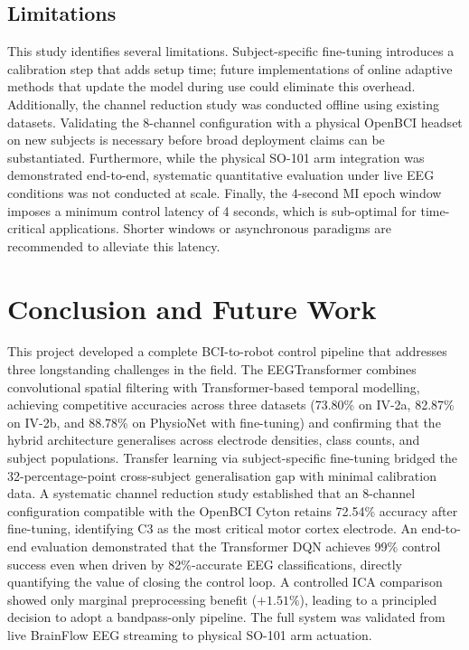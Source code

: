 \documentclass[12pt, a4paper]{article}
\begin{document}
\subsection{Limitations}

This study identifies several limitations. Subject-specific fine-tuning introduces a calibration step that adds setup time; future implementations of online adaptive methods that update the model during use could eliminate this overhead. Additionally, the channel reduction study was conducted offline using existing datasets. Validating the 8-channel configuration with a physical OpenBCI headset on new subjects is necessary before broad deployment claims can be substantiated. Furthermore, while the physical SO-101 arm integration was demonstrated end-to-end, systematic quantitative evaluation under live EEG conditions was not conducted at scale. Finally, the 4-second MI epoch window imposes a minimum control latency of 4 seconds, which is sub-optimal for time-critical applications. Shorter windows or asynchronous paradigms are recommended to alleviate this latency.

\section{Conclusion and Future Work}

This project developed a complete BCI-to-robot control pipeline that addresses three longstanding challenges in the field. The EEGTransformer combines convolutional spatial filtering with Transformer-based temporal modelling, achieving competitive accuracies across three datasets (73.80\% on IV-2a, 82.87\% on IV-2b, and 88.78\% on PhysioNet with fine-tuning) and confirming that the hybrid architecture generalises across electrode densities, class counts, and subject populations. Transfer learning via subject-specific fine-tuning bridged the 32-percentage-point cross-subject generalisation gap with minimal calibration data. A systematic channel reduction study established that an 8-channel configuration compatible with the OpenBCI Cyton retains 72.54\% accuracy after fine-tuning, identifying C3 as the most critical motor cortex electrode. An end-to-end evaluation demonstrated that the Transformer DQN achieves 99\% control success even when driven by 82\%-accurate EEG classifications, directly quantifying the value of closing the control loop. A controlled ICA comparison showed only marginal preprocessing benefit ($+1.51\%$), leading to a principled decision to adopt a bandpass-only pipeline. The full system was validated from live BrainFlow EEG streaming to physical SO-101 arm actuation.
\end{document}
